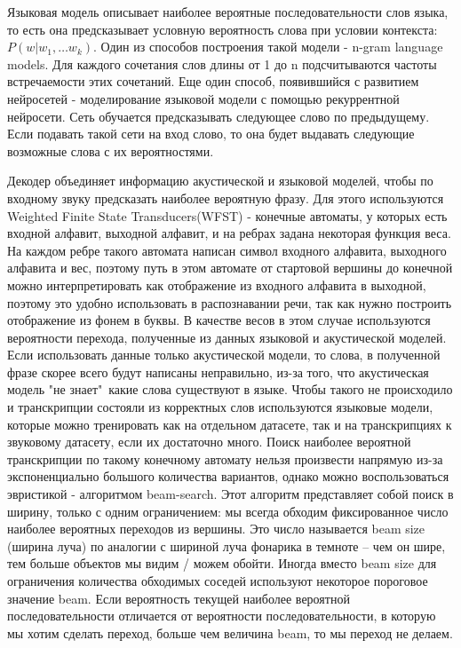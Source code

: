 \documentclass[a4paper,14pt]{extarticle}
\begin{document}
Языковая модель описывает наиболее вероятные последовательности слов языка, то есть она предсказывает условную вероятность слова при условии контекста:
$P(w | w_1, \dots w_k)$.
Один из способов построения такой модели - n-gram language models. Для каждого сочетания слов длины от 1 до n подсчитываются частоты встречаемости этих сочетаний. Еще один способ, появившийся с развитием нейросетей - моделирование языковой модели с помощью рекуррентной нейросети. Сеть обучается предсказывать следующее слово по предыдущему. Если подавать такой сети на вход слово, то она будет выдавать следующие возможные слова с их вероятностями.

Декодер объединяет информацию акустической и языковой моделей, чтобы по входному звуку предсказать наиболее вероятную фразу. Для этого используются Weighted Finite State Transducers(WFST)\cite{mohri2002weighted} - конечные автоматы, у которых есть входной алфавит, выходной алфавит, и на ребрах задана некоторая функция веса. На каждом ребре такого автомата написан символ входного алфавита, выходного алфавита и вес, поэтому путь в этом автомате от стартовой вершины до конечной можно интерпретировать как отображение из входного алфавита в выходной, поэтому это удобно использовать в распознавании речи, так как нужно построить отображение из фонем в буквы. В качестве весов в этом случае используются вероятности перехода, полученные из данных языковой и акустической моделей. Если использовать данные только акустической модели, то слова, в полученной фразе скорее всего будут написаны неправильно, из-за того, что акустическая модель "не знает"\ какие слова существуют в языке. Чтобы такого не происходило и транскрипции состояли из корректных слов используются языковые модели, которые можно тренировать как на отдельном датасете, так и на транскрипциях к звуковому датасету, если их достаточно много. Поиск наиболее вероятной транскрипции по такому конечному автомату нельзя произвести напрямую из-за экспоненциально большого количества вариантов, однако можно воспользоваться эвристикой - алгоритмом beam-search. Этот алгоритм представляет собой поиск в ширину, только с одним ограничением: мы всегда обходим фиксированное число наиболее вероятных переходов из вершины. Это число называется beam size (ширина луча) по аналогии с шириной луча фонарика в темноте -- чем он шире, тем больше объектов мы видим / можем обойти. Иногда вместо beam size для ограничения количества обходимых соседей используют некоторое пороговое значение beam. Если вероятность текущей наиболее вероятной последовательности отличается от вероятности последовательности, в которую мы хотим сделать переход, больше чем величина beam, то мы переход не делаем.
\end{document}
